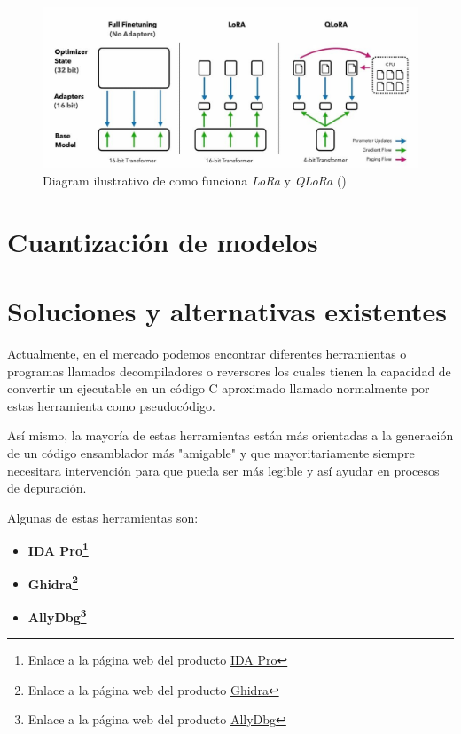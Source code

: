 \begin{figure}[H]
    \begin{center}
      \includegraphics[width=12cm]{figuras/Capitulo_03/QLoRa.jpg}
    \end{center}
    \caption[Diagram ilustrativo de como funciona \textit{LoRa} y \textit{QLoRa}]{Diagram ilustrativo de como funciona \textit{LoRa} y \textit{QLoRa} (\cite{DettmersTim2023QEFo})}
    \label{fig:qlora}
\end{figure}

\section{Cuantización de modelos}
\label{sec:cuantizacion}



\section{Soluciones y alternativas existentes}
\label{sec:alternativas}


Actualmente, en el mercado podemos encontrar diferentes herramientas o programas llamados
decompiladores o reversores los cuales tienen la capacidad de convertir un ejecutable
en un código C aproximado llamado normalmente por estas herramienta como pseudocódigo.

Así mismo, la mayoría de estas herramientas están más orientadas a la generación de un
código ensamblador más "amigable" y que mayoritariamente siempre necesitara intervención
para que pueda ser más legible y así ayudar en procesos de depuración.

Algunas de estas herramientas son:

\begin{itemize}
    \item \bf IDA Pro\footnote{Enlace a la página web del producto \href{https://hex-rays.com/ida-pro/}{IDA Pro}}
    \item \bf Ghidra\footnote{Enlace a la página web del producto \href{https://ghidra-sre.org/}{Ghidra}}
    \item \bf AllyDbg\footnote{Enlace a la página web del producto \href{https://www.ollydbg.de/}{AllyDbg}}
\end{itemize}

